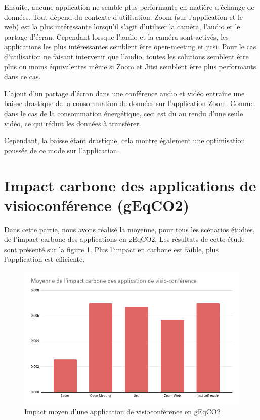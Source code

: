 \documentclass[11pt,a4paper]{report}
\begin{document}
Ensuite, aucune application ne semble plus performante en matière d'échange de données. Tout dépend du contexte d'utilisation. Zoom (sur l'application et le web) est la plus intéressante lorsqu'il s'agit d'utiliser la caméra, l'audio et le partage d'écran. Cependant lorsque l'audio et la caméra sont activés, les applications les plus intéressantes semblent être open-meeting et jitsi.  Pour le cas d'utilisation ne faisant intervenir que l'audio, toutes les solutions semblent être plus ou moins équivalentes même si Zoom et Jitsi semblent être plus performants dans ce cas.

\br L'ajout d'un partage d'écran dans une conférence audio et vidéo entraîne une baisse drastique de la consommation de données sur l'application Zoom. Comme dans le cas de la consommation énergétique, ceci est du au rendu d'une seule vidéo, ce qui réduit les données à transférer. 

\noindent Cependant, la baisse étant drastique, cela montre également une optimisation poussée de ce mode sur l'application. \eb 

\section{Impact carbone des applications de visioconférence (gEqCO2)}

Dans cette partie, nous avons réalisé la moyenne, pour tous les scénarios étudiés, de l'impact carbone  des applications en gEqCO2. Les résultats de cette étude sont présenté sur la figure \ref{fig:my_label}. Plus l'impact en carbone est faible, plus l'application est efficiente.

\begin{figure}[!h]
    \centering
    \includegraphics[scale=0.5]{moyenne.png}
    \caption{Impact moyen d'une application de visioconférence en gEqCO2}
    \label{fig:my_label}
\end{figure}
\end{document}
